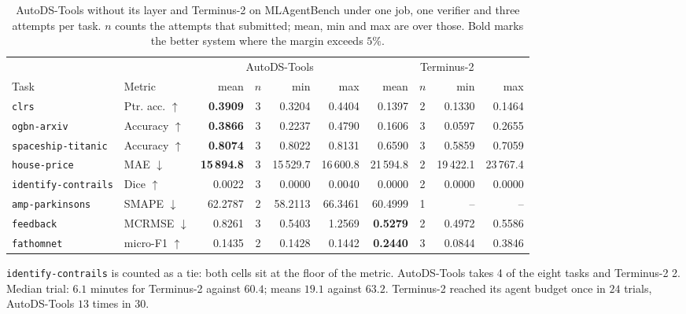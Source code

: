 \begin{table}[t]
\centering
\caption{AutoDS-Tools without its layer and Terminus-2 on MLAgentBench under one job, one verifier and three attempts per task. $n$ counts the attempts that submitted; mean, min and max are over those. Bold marks the better system where the margin exceeds $5\%$.}
\label{tab:mlabhead}
\small
\setlength{\tabcolsep}{5pt}
\begin{tabular}{llrcrrrcrr}
\toprule
 & & \multicolumn{4}{c}{AutoDS-Tools} & \multicolumn{4}{c}{Terminus-2} \\
\cmidrule(lr){3-6}\cmidrule(lr){7-10}
Task & Metric & mean & $n$ & min & max & mean & $n$ & min & max \\
\midrule
\texttt{clrs} & Ptr. acc. $\uparrow$ & \textbf{0.3909} & 3 & 0.3204 & 0.4404 & 0.1397 & 2 & 0.1330 & 0.1464 \\
\texttt{ogbn-arxiv} & Accuracy $\uparrow$ & \textbf{0.3866} & 3 & 0.2237 & 0.4790 & 0.1606 & 3 & 0.0597 & 0.2655 \\
\texttt{spaceship-titanic} & Accuracy $\uparrow$ & \textbf{0.8074} & 3 & 0.8022 & 0.8131 & 0.6590 & 3 & 0.5859 & 0.7059 \\
\texttt{house-price} & MAE $\downarrow$ & \textbf{15\,894.8} & 3 & 15\,529.7 & 16\,600.8 & 21\,594.8 & 2 & 19\,422.1 & 23\,767.4 \\
\texttt{identify-contrails} & Dice $\uparrow$ & 0.0022 & 3 & 0.0000 & 0.0040 & 0.0000 & 2 & 0.0000 & 0.0000 \\
\texttt{amp-parkinsons} & SMAPE $\downarrow$ & 62.2787 & 2 & 58.2113 & 66.3461 & 60.4999 & 1 & -- & -- \\
\texttt{feedback} & MCRMSE $\downarrow$ & 0.8261 & 3 & 0.5403 & 1.2569 & \textbf{0.5279} & 2 & 0.4972 & 0.5586 \\
\texttt{fathomnet} & micro-F1 $\uparrow$ & 0.1435 & 2 & 0.1428 & 0.1442 & \textbf{0.2440} & 3 & 0.0844 & 0.3846 \\
\bottomrule
\end{tabular}
\begin{tablenotes}\footnotesize
\item \texttt{identify-contrails} is counted as a tie: both cells sit at the floor of the metric. AutoDS-Tools takes 4 of the eight tasks and Terminus-2 2. Median trial: $6.1$ minutes for Terminus-2 against $60.4$; means $19.1$ against $63.2$. Terminus-2 reached its agent budget once in $24$ trials, AutoDS-Tools $13$ times in $30$.
\end{tablenotes}
\end{table}
